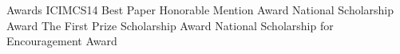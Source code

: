 
\begin{rubric}{Awards}
		ICIMCS14 Best Paper Honorable Mention Award
		National Scholarship  Award
		The First Prize Scholarship  Award
		National Scholarship for Encouragement  Award
\end{rubric}
